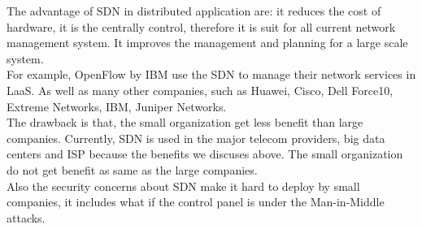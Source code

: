 \documentclass{article}
\begin{document}
The advantage of SDN in distributed application are: it reduces the cost of hardware, it is the centrally control, therefore it is suit for all current network management system. It improves the management and planning for a large scale system.\\

For example, OpenFlow by IBM use the SDN to manage their network services in LaaS. As well as many other companies, such as Huawei, Cisco, Dell Force10, Extreme Networks, IBM, Juniper Networks.\\

The drawback is that, the small organization get less benefit than large companies. Currently, SDN is used in the major telecom providers, big data centers and ISP because the benefits we discuses above. The small organization do not get benefit as same as the large companies.\\

Also the security concerns about SDN make it hard to deploy by small companies, it includes what if the control panel is under the Man-in-Middle attacks.
\end{document}
